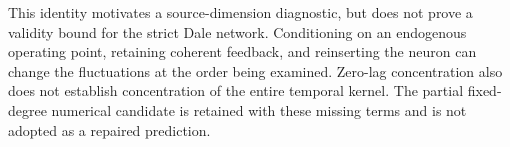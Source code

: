 This identity motivates a source-dimension diagnostic, but does not prove a
validity bound for the strict Dale network. Conditioning on an endogenous
operating point, retaining coherent feedback, and reinserting the neuron can
change the fluctuations at the order being examined. Zero-lag concentration
also does not establish concentration of the entire temporal kernel. The
partial fixed-degree numerical candidate is retained with these missing
terms and is not adopted as a repaired prediction.
